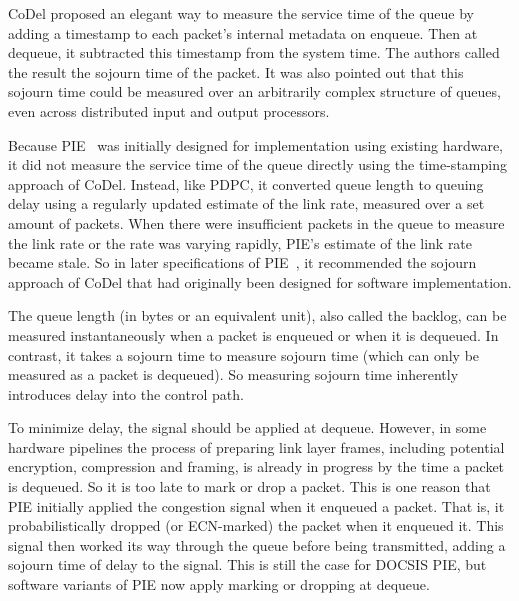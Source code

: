 CoDel proposed an elegant way to measure the service time of the queue by adding a timestamp to each packet's internal metadata on enqueue. Then at dequeue, it subtracted this timestamp from the system time. The authors called the result the sojourn time of the packet. It was also pointed out that this sojourn time could be measured over an arbitrarily complex structure of queues, even across distributed input and output processors.

Because PIE~\cite{Pan13:PIE} was initially designed for implementation using existing hardware, it did not measure the service time of the queue directly using the time-stamping approach of CoDel.
Instead, like PDPC, it converted queue length to queuing delay using a regularly updated 
estimate of the link rate, measured over a set amount of packets. When there were insufficient packets in the queue to measure the link rate or the rate was varying rapidly, PIE's estimate of the link rate became stale. So in later specifications of PIE~\cite{Pan17:PIE}, it recommended the sojourn approach of CoDel that had originally been designed for software implementation.

The queue length (in bytes or an equivalent unit), also called the backlog, can be measured instantaneously when a packet is enqueued or when it is dequeued. In contrast, it takes a sojourn time to measure sojourn time (which can only be measured as a packet is dequeued). So measuring sojourn time inherently introduces delay into the control path.

To minimize delay, the signal should be applied at dequeue. However, in some hardware pipelines the process of preparing link layer frames, including potential encryption, compression and framing, is already in progress by the time a packet is dequeued. So it is too late to mark or drop a packet. This is one reason that PIE initially applied the congestion signal when it enqueued a packet. That is, it probabilistically dropped (or ECN-marked) the packet when it enqueued it. This signal then worked its way through the queue before being transmitted, adding a sojourn time of delay to the signal. This is still the case for DOCSIS PIE, but software variants of PIE now apply marking or dropping at dequeue. 

